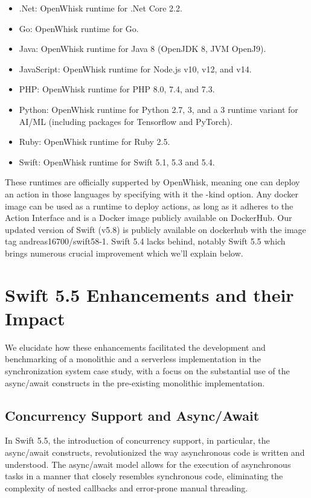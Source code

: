 \begin{itemize}
\item .Net: OpenWhisk runtime for .Net Core 2.2.
\item Go: OpenWhisk runtime for Go.
\item Java: OpenWhisk runtime for Java 8 (OpenJDK 8, JVM OpenJ9).
\item JavaScript: OpenWhisk runtime for Node.js v10, v12, and v14.
\item PHP: OpenWhisk runtime for PHP 8.0, 7.4, and 7.3.
\item Python: OpenWhisk runtime for Python 2.7, 3, and a 3 runtime variant for AI/ML (including packages for Tensorflow and PyTorch).
\item Ruby: OpenWhisk runtime for Ruby 2.5.
\item Swift: OpenWhisk runtime for Swift 5.1, 5.3 and 5.4.
\end{itemize}

These runtimes are officially supperted by OpenWhisk, meaning one can deploy an action in those languages by specifying with it the -kind option.
Any docker image can be used as a runtime to deploy actions, as long as it adheres to the Action Interface and is a Docker image publicly available on DockerHub. Our updated version of Swift (v5.8) is publicly available on dockerhub with the image tag andreas16700/swift58-1.
Swift 5.4 lacks behind, notably Swift 5.5 which brings numerous crucial improvement which we'll explain below.
\section{Swift 5.5 Enhancements and their Impact}
\label{sec:SwiftEnhancements}

We elucidate how these enhancements facilitated the development and benchmarking of a monolithic and a serverless implementation in the synchronization system case study, with a focus on the substantial use of the async/await constructs in the pre-existing monolithic implementation.
\subsection{Concurrency Support and Async/Await}
\label{subsec:ConcurrencySupport}

In Swift 5.5, the introduction of concurrency support, in particular, the async/await constructs, revolutionized the way asynchronous code is written and understood. The async/await model allows for the execution of asynchronous tasks in a manner that closely resembles synchronous code, eliminating the complexity of nested callbacks and error-prone manual threading.

